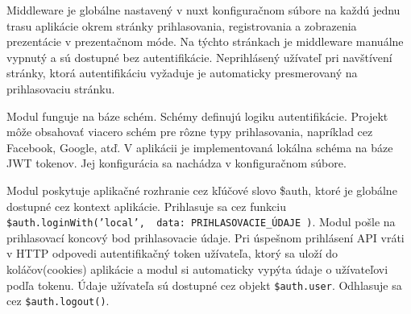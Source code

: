 Middleware je globálne nastavený v nuxt konfiguračnom súbore na každú jednu trasu aplikácie okrem stránky prihlasovania, registrovania a zobrazenia prezentácie v prezentačnom móde. Na týchto stránkach je middleware manuálne vypnutý a sú dostupné bez autentifikácie. Neprihlásený užívateľ pri navštívení stránky, ktorá autentifikáciu vyžaduje je automaticky presmerovaný na prihlasovaciu stránku.

Modul funguje na báze schém. Schémy definujú logiku autentifikácie. Projekt môže obsahovať viacero schém pre rôzne typy prihlasovania, napríklad cez Facebook, Google, atď. V aplikácii je implementovaná lokálna schéma na báze JWT tokenov. Jej konfigurácia sa nachádza v konfiguračnom súbore. 

Modul poskytuje aplikačné rozhranie cez kľúčové slovo \$auth, ktoré je globálne dostupné cez kontext aplikácie. Prihlasuje sa cez funkciu \texttt{\$auth.loginWith('local', { data: PRIHLASOVACIE\_ÚDAJE })}. Modul pošle na prihlasovací koncový bod prihlasovacie údaje. Pri úspešnom prihlásení API vráti v HTTP odpovedi autentifikačný token užívateľa, ktorý sa uloží do koláčov(cookies) aplikácie a modul si automaticky vypýta údaje o užívateľovi podľa tokenu. Údaje užívateľa sú dostupné cez objekt \texttt{\$auth.user}. Odhlasuje sa cez \texttt{\$auth.logout()}.